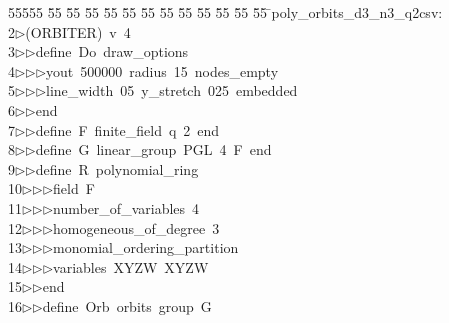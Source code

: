 %
%
\begin{tabbing}
55555 \= 55 \= 55 \= 55 \= 55 \= 55 \= 55 \= 55 \= 55 \= 55 \= 55 \= 55 \= 55 \= \>poly\_orbits\_d3\_n3\_q2csv:\\[0pt]
2\>$\triangleright$\>(ORBITER)\ v\ 4\ \\[0pt]
3\>$\triangleright$\>$\triangleright$\>define\ Do\ draw\_options\ \\[0pt]
4\>$\triangleright$\>$\triangleright$\>$\triangleright$\>yout\ 500000\ radius\ 15\ nodes\_empty\ \\[0pt]
5\>$\triangleright$\>$\triangleright$\>$\triangleright$\>line\_width\ 05\ y\_stretch\ 025\ embedded\ \\[0pt]
6\>$\triangleright$\>$\triangleright$\>end\ \\[0pt]
7\>$\triangleright$\>$\triangleright$\>define\ F\ finite\_field\ q\ 2\ end\ \\[0pt]
8\>$\triangleright$\>$\triangleright$\>define\ G\ linear\_group\ PGL\ 4\ F\ end\ \\[0pt]
9\>$\triangleright$\>$\triangleright$\>define\ R\ polynomial\_ring\ \\[0pt]
10\>$\triangleright$\>$\triangleright$\>$\triangleright$\>field\ F\ \\[0pt]
11\>$\triangleright$\>$\triangleright$\>$\triangleright$\>number\_of\_variables\ 4\ \\[0pt]
12\>$\triangleright$\>$\triangleright$\>$\triangleright$\>homogeneous\_of\_degree\ 3\ \\[0pt]
13\>$\triangleright$\>$\triangleright$\>$\triangleright$\>monomial\_ordering\_partition\ \\[0pt]
14\>$\triangleright$\>$\triangleright$\>$\triangleright$\>variables\ XYZW\ XYZW\ \\[0pt]
15\>$\triangleright$\>$\triangleright$\>end\ \\[0pt]
16\>$\triangleright$\>$\triangleright$\>define\ Orb\ orbits\ group\ G\ \\[0pt]

\end{tabbing}
